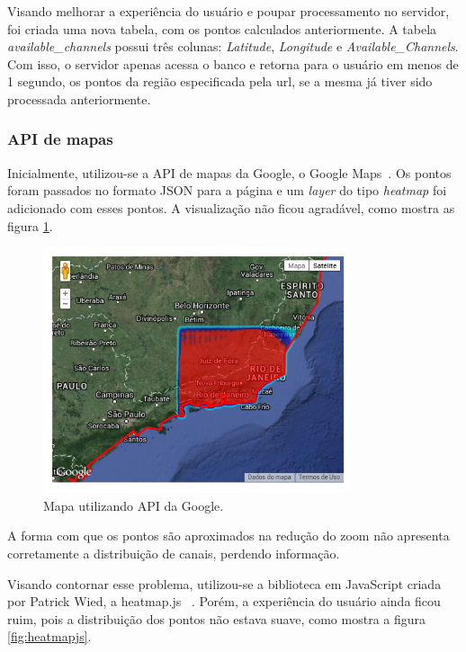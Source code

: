 Visando melhorar a experiência do usuário e poupar processamento no servidor, foi criada uma nova tabela, com os pontos calculados anteriormente. A tabela \textit{available\_channels} possui três colunas: \textit{Latitude}, \textit{Longitude} e \textit{Available\_Channels}. Com isso, o servidor apenas acessa o banco e retorna para o usuário em menos de 1 segundo, os pontos da região especificada pela url, se a mesma já tiver sido processada anteriormente.

\subsubsection{API de mapas}

Inicialmente, utilizou-se a API de mapas da Google, o Google Maps~\cite{googlemaps}. Os pontos foram passados no formato JSON para a página e um \textit{layer} do tipo \textit{heatmap} foi adicionado com esses pontos. A visualização não ficou agradável, como mostra as figura \ref{fig:gmaps}.

\begin{figure}[htb]
\centering
\includegraphics[width=0.8\textwidth]{figs/gmaps}
\caption[Mapa utilizando API da Google.]
{Mapa utilizando API da Google.}
\label{fig:gmaps}
\end{figure} 

A forma com que os pontos são aproximados na redução do zoom não apresenta corretamente a distribuição de canais, perdendo informação.

Visando contornar esse problema, utilizou-se a biblioteca em JavaScript criada por Patrick Wied, a heatmap.js ~\cite{heatmapjs}. Porém, a experiência do usuário ainda ficou ruim, pois a distribuição dos pontos não estava suave, como mostra a figura \ref{fig:heatmapjs}.

